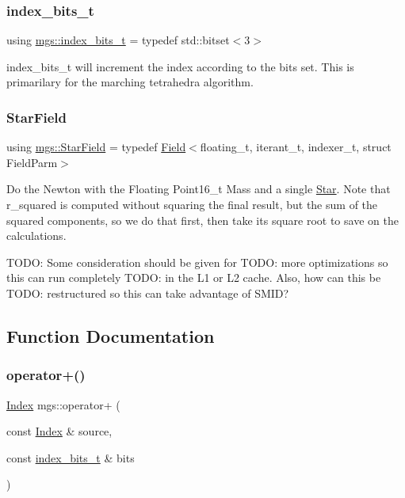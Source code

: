 \subsubsection{\texorpdfstring{index\+\_\+bits\+\_\+t}{index\_bits\_t}}
{\footnotesize\ttfamily using \hyperlink{namespacemgs_a40c361242ea98fb1ff1241d06f7d5568}{mgs\+::index\+\_\+bits\+\_\+t} = typedef std\+::bitset$<$3$>$}

index\+\_\+bits\+\_\+t will increment the index according to the bits set. This is primarilary for the marching tetrahedra algorithm. \mbox{\label{namespacemgs_a7908010cda249b8bf1ea06572a4d4984}} 
\subsubsection{\texorpdfstring{Star\+Field}{StarField}}
{\footnotesize\ttfamily using \hyperlink{namespacemgs_a7908010cda249b8bf1ea06572a4d4984}{mgs\+::\+Star\+Field} = typedef \hyperlink{structmgs_1_1Field}{Field}$<$floating\+\_\+t, iterant\+\_\+t, indexer\+\_\+t, struct Field\+Parm$>$}

Do the Newton with the Floating Point16\+\_\+t Mass and a single \hyperlink{structmgs_1_1Star}{Star}. Note that r\+\_\+squared is computed without squaring the final result, but the sum of the squared components, so we do that first, then take its square root to save on the calculations.

T\+O\+DO\+: Some consideration should be given for T\+O\+DO\+: more optimizations so this can run completely T\+O\+DO\+: in the L1 or L2 cache. Also, how can this be T\+O\+DO\+: restructured so this can take advantage of S\+M\+ID? 

\subsection{Function Documentation}
\mbox{\label{namespacemgs_aa3d52c646ace701de74ece1b83e81c3d}} 
\subsubsection{\texorpdfstring{operator+()}{operator+()}}
{\footnotesize\ttfamily \hyperlink{structmgs_1_1Index}{Index} mgs\+::operator+ (\begin{DoxyParamCaption}\item[{const \hyperlink{structmgs_1_1Index}{Index} \&}]{source,  }\item[{const \hyperlink{namespacemgs_a40c361242ea98fb1ff1241d06f7d5568}{index\+\_\+bits\+\_\+t} \&}]{bits }\end{DoxyParamCaption})\hspace{0.3cm}{\ttfamily [inline]}}

